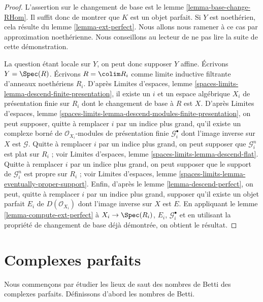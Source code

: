 \begin{proof}
L'assertion sur le changement de base est le lemme \ref{lemma-base-change-RHom}.
Il suffit donc de montrer que $K$ est un objet parfait. Si $Y$ est
noeth\'erien, cela r\'esulte du lemme \ref{lemma-ext-perfect}.
Nous allons nous ramener \`a ce cas par approximation noeth\'erienne.
Nous conseillons au lecteur de ne pas lire la suite de cette d\'emonstration.

\medskip\noindent
La question \'etant locale sur $Y$, on peut donc supposer $Y$ affine.
Écrivons $Y = \Spec(R)$. Écrivons $R = \colim R_i$ comme limite inductive
filtrante d'anneaux noeth\'eriens $R_i$. D'apr\`es Limites d'espaces, lemme
\ref{spaces-limits-lemma-descend-finite-presentation},
il existe un $i$ et un espace alg\'ebrique $X_i$ de pr\'esentation finie
sur $R_i$ dont le changement de base \`a $R$ est $X$. D'apr\`es
Limites d'espaces, lemme
\ref{spaces-limits-lemma-descend-modules-finite-presentation},
on peut supposer, quitte \`a remplacer $i$ par un indice plus grand,
qu'il existe un complexe born\'e de $\mathcal{O}_{X_i}$-modules de pr\'esentation
finie $\mathcal{G}_i^\bullet$ dont
l'image inverse sur $X$ est $\mathcal{G}$. Quitte \`a remplacer $i$
par un indice plus grand,
on peut supposer que $\mathcal{G}_i^n$ est plat sur $R_i$ ; voir
Limites d'espaces, lemme
\ref{spaces-limits-lemma-descend-flat}.
Quitte \`a remplacer $i$ par un indice plus grand, on peut supposer que
le support de $\mathcal{G}_i^n$ est propre sur $R_i$ ; voir
Limites d'espaces, lemme \ref{spaces-limits-lemma-eventually-proper-support}.
Enfin, d'apr\`es le lemme \ref{lemma-descend-perfect},
on peut, quitte \`a remplacer $i$ par un indice plus grand, supposer qu'il
existe un objet parfait $E_i$ de $D(\mathcal{O}_{X_i})$ dont l'image inverse
sur $X$ est $E$. En appliquant le lemme \ref{lemma-compute-ext-perfect}
\`a $X_i \to \Spec(R_i)$, $E_i$, $\mathcal{G}_i^\bullet$ et en utilisant la
propri\'et\'e de changement de base d\'ej\`a d\'emontr\'ee, on obtient le r\'esultat.
\end{proof}







\section{Complexes parfaits}
\label{section-perfect-complexes}

\noindent
Nous commençons par étudier les lieux de saut des nombres de Betti des complexes
parfaits. Définissons d'abord les nombres de Betti.

